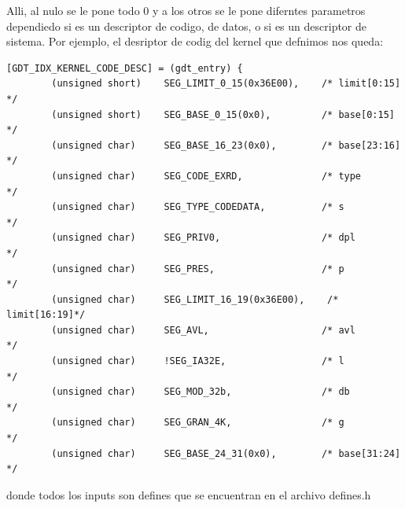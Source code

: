 \documentclass[a4paper]{article}
\newenvironment{codesnippet}{%
	\begin{Sbox}\begin{minipage}{\textwidth}\sffamily\small}%
	{\end{minipage}\end{Sbox}%
		\begin{center}%
		\vspace{-0.4cm}\colorbox{litegrey}{\TheSbox}\end{center}\vspace{0.3cm}}
\begin{document}
Alli, al nulo se le pone todo 0 y a los otros se le pone diferntes parametros dependiedo si es un descriptor de codigo, de datos, o si es un descriptor de sistema. Por ejemplo, el desriptor de codig del kernel que defnimos nos queda:

\begin{codesnippet}
\begin{verbatim}
[GDT_IDX_KERNEL_CODE_DESC] = (gdt_entry) {
        (unsigned short)    SEG_LIMIT_0_15(0x36E00),    /* limit[0:15]  */
        (unsigned short)    SEG_BASE_0_15(0x0),         /* base[0:15]   */
        (unsigned char)     SEG_BASE_16_23(0x0),        /* base[23:16]  */
        (unsigned char)     SEG_CODE_EXRD,              /* type         */ 
        (unsigned char)     SEG_TYPE_CODEDATA,          /* s            */
        (unsigned char)     SEG_PRIV0,                  /* dpl          */
        (unsigned char)     SEG_PRES,                   /* p            */
        (unsigned char)     SEG_LIMIT_16_19(0x36E00),    /* limit[16:19]*/
        (unsigned char)     SEG_AVL,                    /* avl          */
        (unsigned char)     !SEG_IA32E,                 /* l            */
        (unsigned char)     SEG_MOD_32b,                /* db           */
        (unsigned char)     SEG_GRAN_4K,                /* g            */
        (unsigned char)     SEG_BASE_24_31(0x0),        /* base[31:24]  */
\end{verbatim}
\end{codesnippet}

donde todos los inputs son defines que se encuentran en el archivo defines.h
\end{document}
